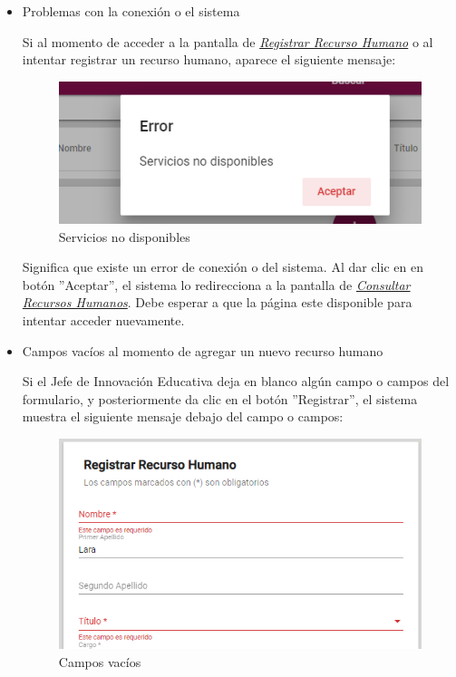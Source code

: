                 \begin{itemize}
                    \item Problemas con la conexión o el sistema

                        Si al momento de acceder a la pantalla de \hyperlink{registrarRH}{\textit{Registrar Recurso Humano}} o al intentar registrar un recurso humano, aparece el siguiente mensaje:

                        \begin{figure}[H]
                        \centering
                        \includegraphics[width=0.4\linewidth]{images/SP1/MSGSN}
                        \caption{Servicios no disponibles}
                        \label{SND}

                      \end{figure}

                        Significa que existe un error de conexión o del sistema. Al dar clic en en botón ''Aceptar'', el sistema lo redirecciona a la pantalla de \hyperlink{consultarRH}{\textit{Consultar Recursos Humanos}}. Debe esperar a que la página este disponible para  intentar acceder nuevamente.

                    \item Campos vacíos al momento de agregar un nuevo recurso humano

                        Si el Jefe de Innovación Educativa deja en blanco algún campo o campos del formulario, y posteriormente da clic en el botón ''Registrar'', el sistema muestra el siguiente mensaje debajo del campo o campos:

                         \begin{figure}[H]
                            \centering
                        \includegraphics[width=0.4\linewidth]{images/SP1/MSG44}
                            \caption{Campos vacíos}
                        \label{mensaje44}
                       \end{figure}


\end{itemize}
